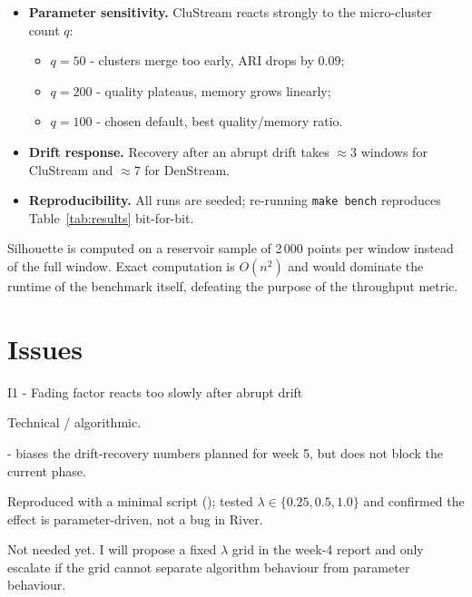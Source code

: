 \begin{itemize}
  \item \textbf{Parameter sensitivity.} CluStream reacts strongly to the
        micro-cluster count $q$:
        \begin{itemize}
          \item $q = 50$ - clusters merge too early, ARI drops by $0.09$;
          \item $q = 200$ - quality plateaus, memory grows linearly;
          \item $q = 100$ - chosen default, best quality/memory ratio.
        \end{itemize}
  \item \textbf{Drift response.} Recovery after an abrupt drift takes
        $\approx 3$ windows for CluStream and $\approx 7$ for DenStream.
  \item \textbf{Reproducibility.} All runs are seeded; re-running
        \texttt{make bench} reproduces Table~\ref{tab:results} bit-for-bit.
\end{itemize}

\begin{notebox}
Silhouette is computed on a reservoir sample of 2\,000 points per window
instead of the full window. Exact computation is $O(n^2)$ and would dominate
the runtime of the benchmark itself, defeating the purpose of the throughput
metric.
\end{notebox}

\section{Issues}

\begin{issuebox}{I1 - Fading factor reacts too slowly after abrupt drift}
\begin{description}[font=\bfseries,style=sameline,leftmargin=0pt,labelindent=0pt,itemindent=0pt,labelwidth=0pt,labelsep=0.4em,itemsep=2pt,topsep=2pt]
  \item[Type:] Technical / algorithmic.
  \item[Impact:]  - biases the drift-recovery numbers
        planned for week 5, but does not block the current phase.
  \item[Handling:] Reproduced with a minimal script
        (); tested $\lambda \in \{0.25, 0.5, 1.0\}$
        and confirmed the effect is parameter-driven, not a bug in River.
  \item[Mentor support:] Not needed yet. I will propose a fixed $\lambda$
        grid in the week-4 report and only escalate if the grid cannot
        separate algorithm behaviour from parameter behaviour.
\end{description}
\end{issuebox}

